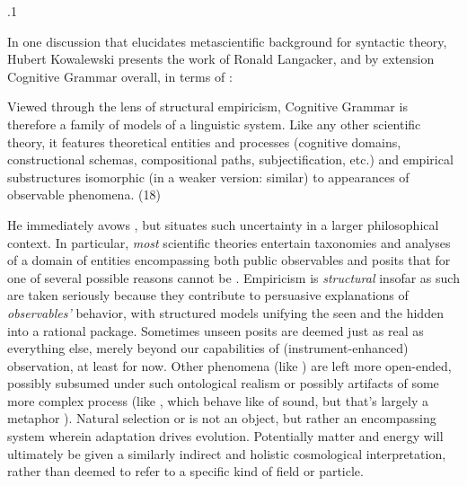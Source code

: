 \documentclass[11pt, twocolumn]{article}
\begin{document}
\p.1{%
\:\+In one discussion that elucidates metascientific
background for syntactic theory, Hubert Kowalewski
presents the work of Ronald Langacker, and by extension
Cognitive Grammar overall, in terms of :   \> \upAdj{3pt}

\begin{blockQuote}
Viewed through the lens of structural empiricism, Cognitive Grammar
is therefore a family of models of a linguistic system. \>  Like any other scientific theory,
it features theoretical entities and processes (cognitive domains,
constructional schemas, compositional paths, subjectification, etc.)
and empirical substructures isomorphic (in a weaker version: similar) to appearances
of observable phenomena. (18)
\end{blockQuote}

\nip{}%
He immediately avows , but situates such uncertainty in a larger philosophical context. \> 
In particular, \textit{most} scientific theories entertain taxonomies and analyses of
a domain of entities encompassing both public observables and 
posits that \mdash{} for one of several possible reasons \mdash{} cannot be . \> 
Empiricism is \textit{structural} insofar as such  are
taken seriously because they contribute to persuasive explanations
of \textit{observables'} behavior, with structured models unifying the seen
and the hidden into a rational package. \>  Sometimes unseen posits are
deemed just as real as everything else, merely beyond our capabilities
of (instrument-enhanced) observation, at least for now. \>  Other phenomena
(like ) are left more open-ended, possibly subsumed under
such ontological realism or possibly artifacts of some more complex process
(like , which behave like  of sound, but
that's largely a metaphor ). \>  Natural selection or 
is not an object, but rather an encompassing system wherein adaptation drives
evolution. \>  Potentially  matter and energy will ultimately
be given a similarly indirect and holistic cosmological interpretation,
rather than deemed to refer to a specific kind of field or particle.\<\;
}%
\end{document}
